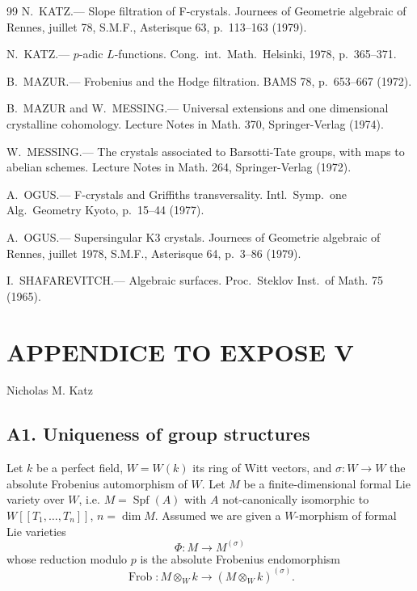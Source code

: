 \documentclass[12pt,a4paper]{article}
\theoremstyle{plain}
\theoremstyle{definition}
\theoremstyle{remark}
\DeclareMathOperator{\Spf}{Spf}
\DeclareMathOperator{\Frob}{Frob}
\begin{document}
\begin{thebibliography}{99}
N.\ KATZ.--- Slope filtration of F-crystals. Journees of Geometrie algebraic of Rennes, juillet 78, S.M.F., Asterisque 63, p.\ 113--163 (1979).

N.\ KATZ.--- $p$-adic $L$-functions. Cong.\ int.\ Math.\ Helsinki, 1978, p.\ 365--371.

B.\ MAZUR.--- Frobenius and the Hodge filtration. BAMS 78, p.\ 653--667 (1972).

B.\ MAZUR and W.\ MESSING.--- Universal extensions and one dimensional crystalline cohomology. Lecture Notes in Math. 370, Springer-Verlag (1974).

W.\ MESSING.--- The crystals associated to Barsotti-Tate groups, with maps to abelian schemes. Lecture Notes in Math. 264, Springer-Verlag (1972).

A.\ OGUS.--- F-crystals and Griffiths transversality. Intl.\ Symp.\ one Alg.\ Geometry Kyoto, p.\ 15--44 (1977).

A.\ OGUS.--- Supersingular K3 crystals. Journees of Geometrie algebraic of Rennes, juillet 1978, S.M.F., Asterisque 64, p.\ 3--86 (1979).

I.\ SHAFAREVITCH.--- Algebraic surfaces. Proc.\ Steklov Inst.\ of Math. 75 (1965).

\end{thebibliography}

\newpage

\section*{APPENDICE TO EXPOSE V}

\begin{center}
Nicholas M. Katz
\end{center}

\subsection*{A1. Uniqueness of group structures}

Let $k$ be a perfect field, $W = W(k)$ its ring of Witt vectors, and $\sigma : W \to W$ the absolute Frobenius automorphism of $W$. Let $M$ be a finite-dimensional formal Lie variety over $W$, i.e. $M = \Spf(A)$ with $A$ not-canonically isomorphic to $W[[T_1, \ldots, T_n]]$, $n = \dim M$. Assumed we are given a $W$-morphism of formal Lie varieties
\[
\Phi : M \longrightarrow M^{(\sigma)}
\]
whose reduction modulo $p$ is the absolute Frobenius endomorphism
\[
\Frob : M \otimes_W k \longrightarrow (M \otimes_W k)^{(\sigma)}.
\]
\end{document}
